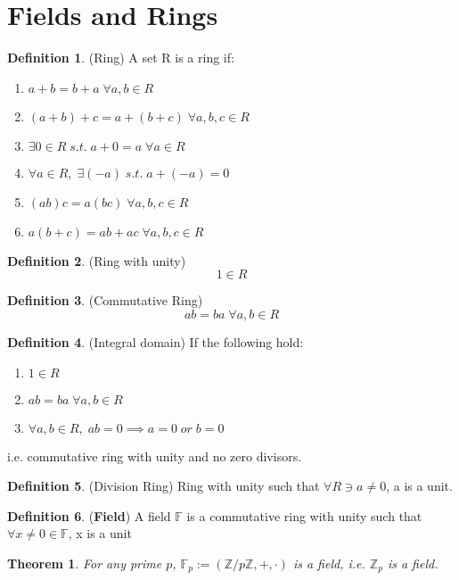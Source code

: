 \documentclass[12pt]{article}
\newtheorem{theorem}{Theorem}[section]
\theoremstyle{definition}
\newtheorem{definition}{Definition}[section]
\theoremstyle{remark}
\begin{document}
\section{Fields and Rings}
    \begin{definition}(Ring)
        A set R is a ring if:
        \begin{enumerate}
            \item $a+b= b+a \; \forall a,b \in R$
            \item $(a+b) +c = a+(b+c) \; \forall a,b,c \in R$
            \item $\exists 0 \in R \; s.t. \; a+0= a \; \forall a \in R$
            \item $\forall a \in R,\; \exists (-a) \; s.t. \; a + (-a) = 0$
            \item $(ab)c= a(bc) \; \forall a,b,c \in R$
            \item $a(b+c)= ab+ ac \; \forall a,b,c \in R$
        \end{enumerate}
    \end{definition}
    \begin{definition}(Ring with unity)
        $$1\in R$$
    \end{definition}
    \begin{definition}(Commutative Ring)
        $$ ab = ba \; \forall a, b \in R$$
    \end{definition}
    \begin{definition}(Integral domain)
        If the following hold:
        \begin{enumerate}
            \item $1\in R$
            \item $ ab = ba \; \forall a, b \in R$
            \item $\forall a,b \in R, \; ab=0 \implies a=0 \; or \; b=0$
        \end{enumerate}
        i.e. commutative ring with unity and no zero divisors.
    \end{definition}
    \begin{definition}(Division Ring)
        Ring with unity such that $\forall R\ni a \neq 0$, a is a unit.
    \end{definition}
    \begin{definition}(\textbf{Field})
        A field $\mathbb{F}$ is a commutative ring with unity such that $\forall x\neq 0 \in \mathbb{F}$, x is a unit
    \end{definition}
    \begin{theorem}
        For any prime $p$, $\mathbb{F}_p:=(\mathbb{Z}/p\mathbb{Z},+,\cdot)$ is a field, i.e. $\mathbb{Z}_p$ is a field.
    \end{theorem}
\end{document}
